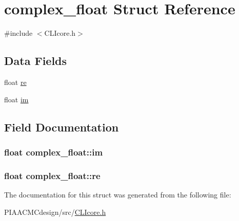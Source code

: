 \hypertarget{structcomplex__float}{\section{complex\+\_\+float Struct Reference}
\label{structcomplex__float}
}


{\ttfamily \#include $<$C\+L\+Icore.\+h$>$}

\subsection*{Data Fields}
\begin{DoxyCompactItemize}
\item 
float \hyperlink{structcomplex__float_a170e8285dc5452b1c27d6a97590509dd}{re}
\item 
float \hyperlink{structcomplex__float_a96d96e19d16b6b08e43fb799c6406f0a}{im}
\end{DoxyCompactItemize}


\subsection{Field Documentation}
\hypertarget{structcomplex__float_a96d96e19d16b6b08e43fb799c6406f0a}{
\subsubsection[{im}]{\setlength{\rightskip}{0pt plus 5cm}float complex\+\_\+float\+::im}}\label{structcomplex__float_a96d96e19d16b6b08e43fb799c6406f0a}
\hypertarget{structcomplex__float_a170e8285dc5452b1c27d6a97590509dd}{
\subsubsection[{re}]{\setlength{\rightskip}{0pt plus 5cm}float complex\+\_\+float\+::re}}\label{structcomplex__float_a170e8285dc5452b1c27d6a97590509dd}


The documentation for this struct was generated from the following file\+:\begin{DoxyCompactItemize}
\item 
P\+I\+A\+A\+C\+M\+Cdesign/src/\hyperlink{PIAACMCdesign_2src_2CLIcore_8h}{C\+L\+Icore.\+h}\end{DoxyCompactItemize}

